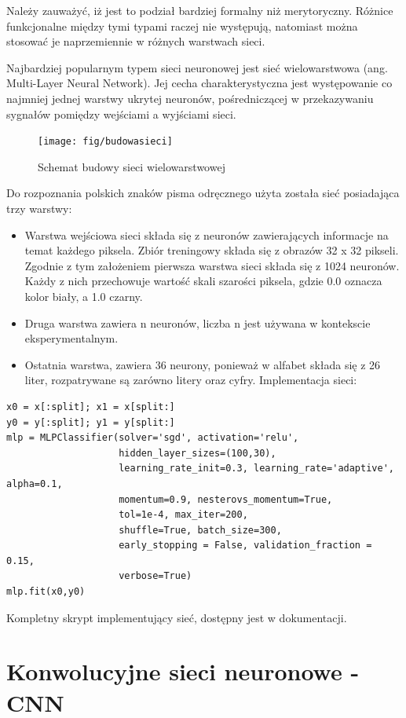 \documentclass[brudnopis]{xmgr}
\begin{document}
Należy zauważyć, iż jest to podział bardziej formalny niż merytoryczny. Różnice funkcjonalne między tymi typami raczej nie występują, natomiast można stosować je naprzemiennie w różnych warstwach sieci.

Najbardziej popularnym typem sieci neuronowej jest sieć wielowarstwowa (ang. Multi-Layer Neural Network). Jej cecha charakterystyczna jest występowanie co najmniej jednej warstwy ukrytej neuronów, pośredniczącej w przekazywaniu sygnałów pomiędzy wejściami a wyjściami sieci.

\begin{figure}[!tbh]
\centering
\texttt{[image: fig/budowasieci]}
\caption{Schemat budowy sieci wielowarstwowej}
\end{figure}
\newpage

Do rozpoznania polskich znaków pisma odręcznego użyta została sieć posiadająca trzy warstwy:

\begin{itemize}
\item
Warstwa wejściowa sieci składa się z neuronów zawierających informacje na temat każdego piksela. Zbiór treningowy składa się z obrazów 32 x 32 pikseli. Zgodnie z tym założeniem pierwsza warstwa sieci składa się z 1024 neuronów. Każdy z nich przechowuje wartość skali szarości piksela, gdzie 0.0 oznacza kolor biały, a 1.0 czarny.
\item
Druga warstwa zawiera n neuronów, liczba n jest używana w kontekscie eksperymentalnym.
\item
Ostatnia warstwa, zawiera 36 neurony, ponieważ w alfabet składa się z 26 liter, rozpatrywane są zarówno litery oraz cyfry. Implementacja sieci:
\end{itemize}

\begin{lstlisting}
x0 = x[:split]; x1 = x[split:]
y0 = y[:split]; y1 = y[split:]
mlp = MLPClassifier(solver='sgd', activation='relu',
                    hidden_layer_sizes=(100,30),
                    learning_rate_init=0.3, learning_rate='adaptive', alpha=0.1,
                    momentum=0.9, nesterovs_momentum=True,
                    tol=1e-4, max_iter=200,
                    shuffle=True, batch_size=300,
                    early_stopping = False, validation_fraction = 0.15,
                    verbose=True)
mlp.fit(x0,y0)
\end{lstlisting}

Kompletny skrypt implementujący sieć, dostępny jest w dokumentacji.

\section{Konwolucyjne sieci neuronowe - CNN}
\end{document}
